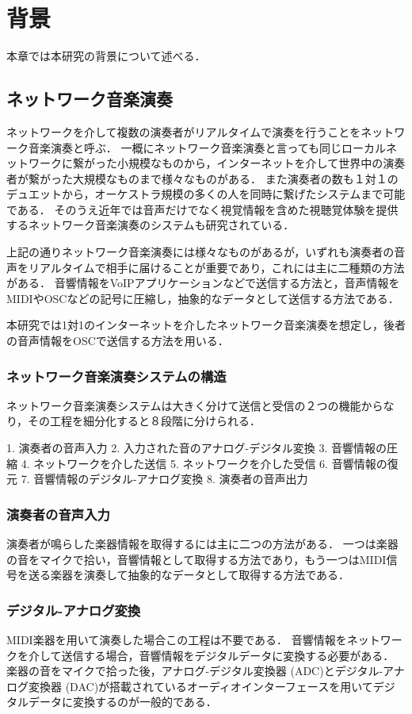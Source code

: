 \chapter{背景}
\label{background}

本章では本研究の背景について述べる．

\section{ネットワーク音楽演奏}
ネットワークを介して複数の演奏者がリアルタイムで演奏を行うことをネットワーク音楽演奏と呼ぶ．
一概にネットワーク音楽演奏と言っても同じローカルネットワークに繋がった小規模なものから，インターネットを介して世界中の演奏者が繋がった大規模なものまで様々なものがある．
また演奏者の数も１対１のデュエットから，オーケストラ規模の多くの人を同時に繋げたシステムまで可能である．
そのうえ近年では音声だけでなく視覚情報を含めた視聴覚体験を提供するネットワーク音楽演奏のシステムも研究されている．

上記の通りネットワーク音楽演奏には様々なものがあるが，いずれも演奏者の音声をリアルタイムで相手に届けることが重要であり，これには主に二種類の方法がある．
音響情報をVoIPアプリケーションなどで送信する方法と，音声情報をMIDIやOSCなどの記号に圧縮し，抽象的なデータとして送信する方法である．

本研究では1対1のインターネットを介したネットワーク音楽演奏を想定し，後者の音声情報をOSCで送信する方法を用いる．

\subsection{ネットワーク音楽演奏システムの構造}
ネットワーク音楽演奏システムは大きく分けて送信と受信の２つの機能からなり，その工程を細分化すると８段階に分けられる．

1. 演奏者の音声入力
2. 入力された音のアナログ-デジタル変換
3. 音響情報の圧縮
4. ネットワークを介した送信
5. ネットワークを介した受信
6. 音響情報の復元
7. 音響情報のデジタル-アナログ変換
8. 演奏者の音声出力

\subsection{演奏者の音声入力}
演奏者が鳴らした楽器情報を取得するには主に二つの方法がある．
一つは楽器の音をマイクで拾い，音響情報として取得する方法であり，もう一つはMIDI信号を送る楽器を演奏して抽象的なデータとして取得する方法である．

\subsection{デジタル-アナログ変換}
MIDI楽器を用いて演奏した場合この工程は不要である．
音響情報をネットワークを介して送信する場合，音響情報をデジタルデータに変換する必要がある．
楽器の音をマイクで拾った後，アナログ-デジタル変換器 (ADC)とデジタル-アナログ変換器 (DAC)が搭載されているオーディオインターフェースを用いてデジタルデータに変換するのが一般的である．

